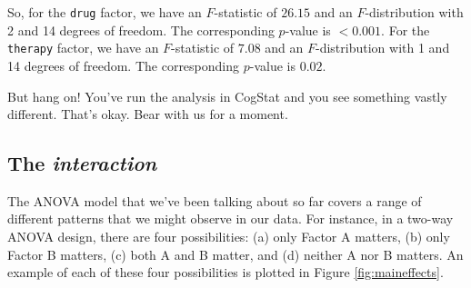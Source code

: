 \documentclass[
]{book}
\theoremstyle{definition}
\theoremstyle{definition}
\theoremstyle{definition}
\theoremstyle{definition}
\theoremstyle{remark}
\begin{document}
So, for the \texttt{drug} factor, we have an \(F\)-statistic of \(26.15\) and an \(F\)-distribution with 2 and 14 degrees of freedom. The corresponding \(p\)-value is \(<0.001\). For the \texttt{therapy} factor, we have an \(F\)-statistic of \(7.08\) and an \(F\)-distribution with 1 and 14 degrees of freedom. The corresponding \(p\)-value is \(0.02\).

But hang on! You've run the analysis in CogStat and you see something vastly different. That's okay. Bear with us for a moment.

\hypertarget{the-interaction}{%
\subsection{\texorpdfstring{The \emph{interaction}}{The interaction}}\label{the-interaction}}

The ANOVA model that we've been talking about so far covers a range of different patterns that we might observe in our data. For instance, in a two-way ANOVA design, there are four possibilities: (a) only Factor A matters, (b) only Factor B matters, (c) both A and B matter, and (d) neither A nor B matters. An example of each of these four possibilities is plotted in Figure \ref{fig:maineffects}.
\end{document}
